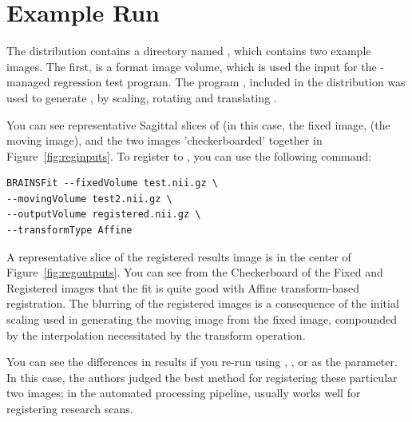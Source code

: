 \documentclass{InsightArticle}
\begin{document}
\section{Example Run}
The \miregprog{} distribution contains a directory named , which contains two example images.  The first,  is a  format image volume, which is used the input for the -managed regression test program.  The program , included in the \miregprog{} distribution was used to generate , by scaling, rotating and translating .

You can see representative Sagittal slices of  (in this case, the fixed image,  (the moving image), and the two images 'checkerboarded' together in Figure~\ref{fig:reginputs}.  To register  to , you can use the following command:
\small
\begin{verbatim}
BRAINSFit --fixedVolume test.nii.gz \
--movingVolume test2.nii.gz \
--outputVolume registered.nii.gz \
--transformType Affine 
\end{verbatim}
\normalsize
\parbox{\textwidth}
{A representative slice of the registered results image  is in the center of Figure~\ref{fig:regoutputs}. You can see from the Checkerboard of the Fixed and Registered images that the fit is quite good with Affine transform-based registration.  The blurring of the registered images is a consequence of the initial scaling used in generating the moving image from the fixed image, compounded by the interpolation necessitated by the transform operation.

You can see the differences in results if you re-run  using , , or  as the  parameter.  In this case, the authors judged  the best method for registering these particular two images;  in the \brainstwoprog{} automated processing pipeline,  usually works well for registering research scans.}
\end{document}
